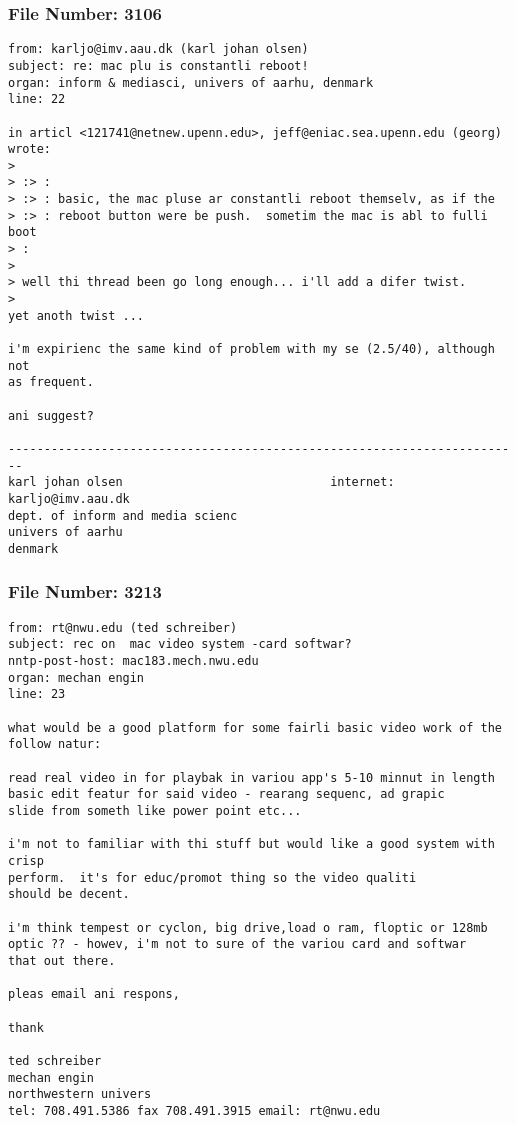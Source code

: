 \subsubsection*{File Number: 3106}
\scriptsize\begin{verbatim}
from: karljo@imv.aau.dk (karl johan olsen)
subject: re: mac plu is constantli reboot!
organ: inform & mediasci, univers of aarhu, denmark
line: 22

in articl <121741@netnew.upenn.edu>, jeff@eniac.sea.upenn.edu (georg)
wrote:
> 
> :> :
> :> : basic, the mac pluse ar constantli reboot themselv, as if the
> :> : reboot button were be push.  sometim the mac is abl to fulli boot
> :
> 
> well thi thread been go long enough... i'll add a difer twist.
> 
yet anoth twist ...

i'm expirienc the same kind of problem with my se (2.5/40), although not
as frequent.

ani suggest?

------------------------------------------------------------------------
karl johan olsen                             internet: karljo@imv.aau.dk
dept. of inform and media scienc          
univers of aarhu
denmark
\end{verbatim}
\subsubsection*{File Number: 3213}
\scriptsize\begin{verbatim}
from: rt@nwu.edu (ted schreiber)
subject: rec on  mac video system -card softwar?
nntp-post-host: mac183.mech.nwu.edu
organ: mechan engin
line: 23

what would be a good platform for some fairli basic video work of the
follow natur:

read real video in for playbak in variou app's 5-10 minnut in length
basic edit featur for said video - rearang sequenc, ad grapic
slide from someth like power point etc... 

i'm not to familiar with thi stuff but would like a good system with crisp
perform.  it's for educ/promot thing so the video qualiti
should be decent.

i'm think tempest or cyclon, big drive,load o ram, floptic or 128mb
optic ?? - howev, i'm not to sure of the variou card and softwar
that out there.

pleas email ani respons,

thank

ted schreiber
mechan engin 
northwestern univers
tel: 708.491.5386 fax 708.491.3915 email: rt@nwu.edu
\end{verbatim}
